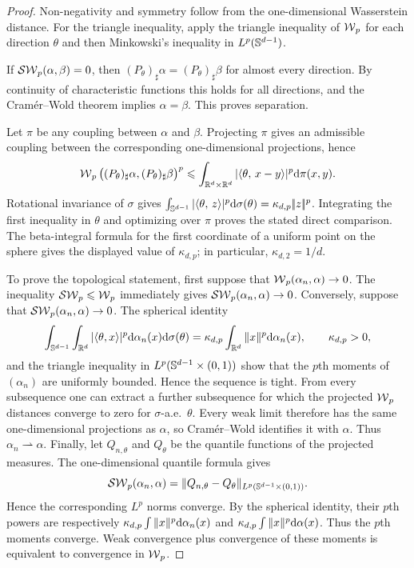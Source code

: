 \begin{proof}
	Non-negativity and symmetry follow from the one-dimensional Wasserstein distance. For the triangle inequality, apply the triangle inequality of $\operatorname{\mathcal{W}}_p$ for each direction $\theta$ and then Minkowski's inequality in $L^p(\mathbb{S}^{d-1})$.

	If $\operatorname{\mathcal{SW}}_p(\alpha,\beta)=0$, then $(P_\theta)_\sharp\alpha=(P_\theta)_\sharp\beta$ for almost every direction. By continuity of characteristic functions this holds for all directions, and the Cram\'er--Wold theorem implies $\alpha=\beta$. This proves separation.

	Let $\pi$ be any coupling between $\alpha$ and $\beta$. Projecting $\pi$ gives an admissible coupling between the corresponding one-dimensional projections, hence
	\[
		\operatorname{\mathcal{W}}_p\big((P_\theta)_\sharp\alpha,(P_\theta)_\sharp\beta\big)^p
		\leqslant
		\int_{\mathbb{R}^d\times\mathbb{R}^d}|\langle \theta,\,x-y\rangle|^p\mathrm{d}\pi(x,y).
	\]
	Rotational invariance of $\sigma$ gives
	$\int_{\mathbb{S}^{d-1}}|\langle \theta,\,z\rangle|^p\mathrm{d}\sigma(\theta) = \kappa_{d,p}|\!| z |\!|^p$.
	Integrating the first inequality in $\theta$ and optimizing over $\pi$ proves the stated direct comparison. The beta-integral formula for the first coordinate of a uniform point on the sphere gives the displayed value of $\kappa_{d,p}$; in particular, $\kappa_{d,2}=1/d$.

	To prove the topological statement, first suppose that $\operatorname{\mathcal{W}}_p(\alpha_n,\alpha)\to0$. The inequality $\operatorname{\mathcal{SW}}_p\leqslant\operatorname{\mathcal{W}}_p$ immediately gives $\operatorname{\mathcal{SW}}_p(\alpha_n,\alpha)\to0$. Conversely, suppose that $\operatorname{\mathcal{SW}}_p(\alpha_n,\alpha)\to0$. The spherical identity
	\[
		\int_{\mathbb{S}^{d-1}}\int_{\mathbb{R}^d}|\langle\theta,x\rangle|^p\mathrm{d}\alpha_n(x)\mathrm{d}\sigma(\theta)
		=
		\kappa_{d,p}\int_{\mathbb{R}^d}\|x\|^p\mathrm{d}\alpha_n(x),
		\qquad
		\kappa_{d,p}>0,
	\]
	and the triangle inequality in $L^p(\mathbb{S}^{d-1}\times(0,1))$ show that the $p$th moments of $(\alpha_n)$ are uniformly bounded. Hence the sequence is tight. From every subsequence one can extract a further subsequence for which the projected $\operatorname{\mathcal{W}}_p$ distances converge to zero for $\sigma$-a.e.\ $\theta$. Every weak limit therefore has the same one-dimensional projections as $\alpha$, so Cram\'er--Wold identifies it with $\alpha$. Thus $\alpha_n\rightharpoonup\alpha$. Finally, let $Q_{n,\theta}$ and $Q_\theta$ be the quantile functions of the projected measures. The one-dimensional quantile formula gives
	\[
		\operatorname{\mathcal{SW}}_p(\alpha_n,\alpha)
		=
		\|Q_{n,\theta}-Q_\theta\|_{L^p(\mathbb{S}^{d-1}\times(0,1))}.
	\]
	Hence the corresponding $L^p$ norms converge. By the spherical identity, their $p$th powers are respectively $\kappa_{d,p}\int\|x\|^p\mathrm{d}\alpha_n(x)$ and $\kappa_{d,p}\int\|x\|^p\mathrm{d}\alpha(x)$. Thus the $p$th moments converge. Weak convergence plus convergence of these moments is equivalent to convergence in $\operatorname{\mathcal{W}}_p$.


\end{proof}
